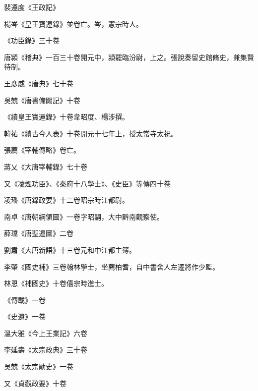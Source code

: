 \begin{pinyinscope}
 裴遵度《王政記》



 楊岑《皇王寶運錄》並卷亡。岑，憲宗時人。



 《功臣錄》三十卷



 唐潁《稽典》一百三十卷開元中，潁罷臨汾尉，上之。張說奏留史館脩史，兼集賢待制。



 王彥威《唐典》七十卷



 吳兢《唐書備闕記》十卷



 《續皇王寶運錄》十卷韋昭度、楊涉撰。



 韓祐《續古今人表》十卷開元十七年上，授太常寺太祝。



 張薦《宰輔傳略》卷亡。



 蔣乂《大唐宰輔錄》七十卷



 又《凌煙功臣》、《秦府十八學士》、《史臣》等傳四十卷



 凌璠《唐錄政要》十二卷昭宗時江都尉。



 南卓《唐朝綱領圖》一卷字昭嗣，大中黔南觀察使。



 薛璫《唐聖運圖》二卷



 劉肅《大唐新語》十三卷元和中江都主簿。



 李肇《國史補》三卷翰林學士，坐薦柏耆，自中書舍人左遷將作少監。



 林恩《補國史》十卷僖宗時進士。



 《傳載》一卷



 《史遺》一卷



 溫大雅《今上王業記》六卷



 李延壽《太宗政典》三十卷



 吳兢《太宗勛史》一卷



 又《貞觀政要》十卷




\end{pinyinscope}
